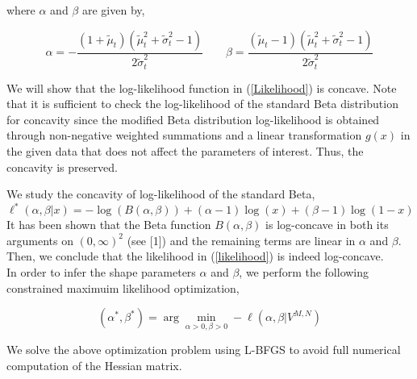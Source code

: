 \documentclass[10pt,twocolumn,letterpaper]{article}
\begin{document}
where $\alpha$ and $\beta$ are given by,

\begin{equation}
\alpha = - \frac{(1+\tilde{\mu}_t )(\tilde{\mu}_t^2 + \tilde{\sigma}_t^2 -1)}{2 \tilde{\sigma}_t^2} \quad \quad \beta =  \frac{(\tilde{\mu}_t-1 )(\tilde{\mu}_t^2 + \tilde{\sigma}_t^2 -1)}{2 \tilde{\sigma}_t^2} \label{param_transformed_beta}
\end{equation}

We will show that the log-likelihood function in (\ref{Likelihood}) is concave. Note that it is sufficient to check the log-likelihood of the standard Beta distribution for concavity since the modified Beta distribution log-likelihood is obtained through non-negative weighted summations and a linear transformation $g(x)$ in the given data that does not affect the parameters of interest. Thus, the concavity is preserved. 

We study the concavity of  log-likelihood of the standard Beta,
\begin{equation*}
\ell^*(\alpha, \beta |x)=-\log (B(\alpha ,\beta ))+(\alpha -1) \log (x)+(\beta -1) \log (1-x)\end{equation*}
It has been shown that the Beta function $B(\alpha, \beta)$ is log-concave in both its arguments on $(0, \infty)^2$ (see [1]) and the remaining terms are linear in $\alpha$ and $\beta$. Then, we conclude that the likelihood in (\ref{likelihood}) is indeed log-concave.\\

In order to infer the shape parameters $\alpha$ and $\beta$, we perform the following constrained maximuim likelihood optimization, 

\begin{equation}
(\alpha^* , \beta^*) = \arg \underset{\alpha>0, \beta>0}{\min} - \ell(\alpha, \beta | V^{M,N} )
\end{equation}
 
We solve the above optimization problem using L-BFGS to avoid full numerical computation of the Hessian matrix.
\end{document}
